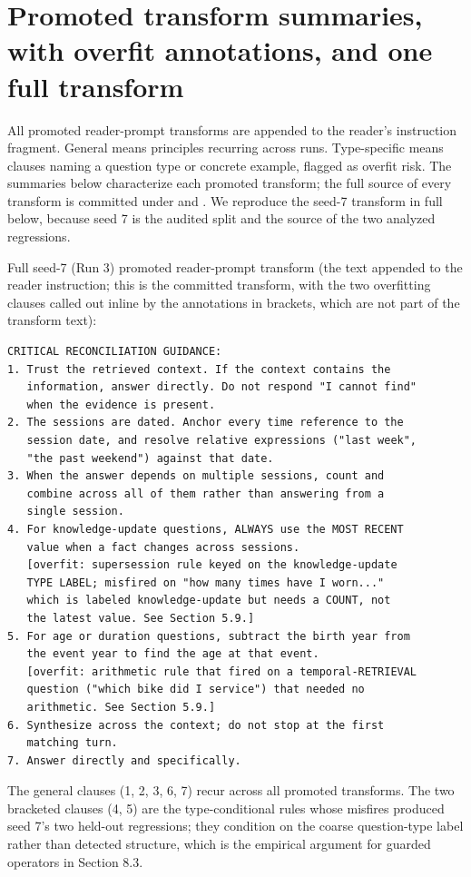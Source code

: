 \appendix
\section{Promoted transform summaries, with overfit annotations, and one full transform}

All promoted reader-prompt transforms are appended to the reader's instruction fragment. General means principles recurring across runs. Type-specific means clauses naming a question type or concrete example, flagged as overfit risk. The summaries below characterize each promoted transform; the full source of every transform is committed under  and . We reproduce the seed-7 transform in full below, because seed 7 is the audited split and the source of the two analyzed regressions.

Full seed-7 (Run 3) promoted reader-prompt transform (the text appended to the reader instruction; this is the committed transform, with the two overfitting clauses called out inline by the annotations in brackets, which are not part of the transform text):

\begin{verbatim}
CRITICAL RECONCILIATION GUIDANCE:
1. Trust the retrieved context. If the context contains the
   information, answer directly. Do not respond "I cannot find"
   when the evidence is present.
2. The sessions are dated. Anchor every time reference to the
   session date, and resolve relative expressions ("last week",
   "the past weekend") against that date.
3. When the answer depends on multiple sessions, count and
   combine across all of them rather than answering from a
   single session.
4. For knowledge-update questions, ALWAYS use the MOST RECENT
   value when a fact changes across sessions.
   [overfit: supersession rule keyed on the knowledge-update
   TYPE LABEL; misfired on "how many times have I worn..."
   which is labeled knowledge-update but needs a COUNT, not
   the latest value. See Section 5.9.]
5. For age or duration questions, subtract the birth year from
   the event year to find the age at that event.
   [overfit: arithmetic rule that fired on a temporal-RETRIEVAL
   question ("which bike did I service") that needed no
   arithmetic. See Section 5.9.]
6. Synthesize across the context; do not stop at the first
   matching turn.
7. Answer directly and specifically.
\end{verbatim}

The general clauses (1, 2, 3, 6, 7) recur across all promoted transforms. The two bracketed clauses (4, 5) are the type-conditional rules whose misfires produced seed 7's two held-out regressions; they condition on the coarse question-type label rather than detected structure, which is the empirical argument for guarded operators in Section 8.3.

